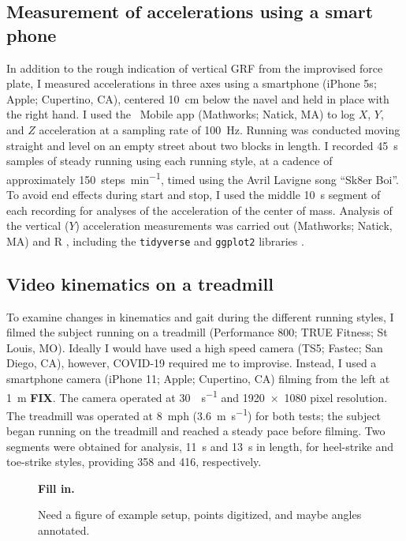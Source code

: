 \subsection{Measurement of accelerations using a smart phone}
In addition to the rough indication of vertical GRF from the improvised force plate, I measured accelerations in three axes using a smartphone (iPhone 5s; Apple; Cupertino, CA), centered \SI{10}{\centi\meter} below the navel and held in place with the right hand. I used the \Matlab\ Mobile app (Mathworks; Natick, MA) to log $X$, $Y$, and $Z$ acceleration at a sampling rate of \SI{100}{\hertz}.  Running was conducted moving straight and level on an empty street about two blocks in length. I recorded \SI{45}{\second} samples of steady running using each running style, at a cadence of approximately \SI{150}{steps\per\minute}, timed using the Avril Lavigne song ``Sk8er Boi''. To avoid end effects during start and stop, I used the middle \SI{10}{\second} segment of each recording for analyses of the acceleration of the center of mass. Analysis of the vertical ($Y$) acceleration measurements was carried out \Matlab (Mathworks; Natick, MA) and R \cite{r2020}, including the \lstinline{tidyverse} and \lstinline{ggplot2} libraries \citep{wickham2019tidyverse}. 



\subsection{Video kinematics on a treadmill}
To examine changes in kinematics and gait during the different running styles, I filmed the subject running on a treadmill (Performance 800; TRUE Fitness; St Louis, MO). Ideally I would have used a high speed camera (TS5; Fastec; San Diego, CA), however, COVID-19 required me to improvise. Instead, I used a smartphone camera (iPhone 11; Apple; Cupertino, CA) filming from the left at \SI{1}{\meter} \textbf{FIX}. The camera operated at \SI{30}{\frame\per\second} and \num{1920x1080} pixel resolution. The treadmill was operated at \SI{8}{mph} (\SI{3.6}{\meter\per\second}) for both tests; the subject began running on the treadmill and reached a steady pace before filming.  Two segments were obtained for analysis, \SI{11}{\second} and \SI{13}{\second} in length, for heel-strike and toe-strike styles, providing \SI{358}{\frame} and \SI{416}{\frame}, respectively.
\begin{figure}
\begin{center}
    \textbf{Fill in.}
\end{center}
\caption{Need a figure of example setup, points digitized, and maybe angles annotated.}
\label{fig:methods:kinematics}
\end{figure}

